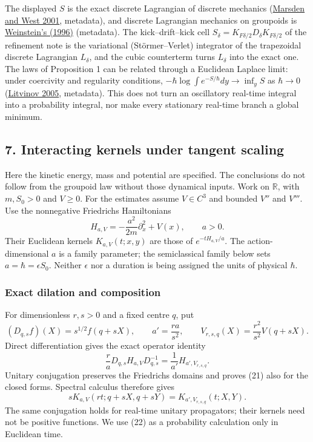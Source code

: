 \documentclass[11pt,a4paper]{article}
\begin{document}
The displayed \(S\) is the exact discrete Lagrangian of discrete
mechanics (\href{https://doi.org/10.1017/S096249290100006X}{Marsden and
West 2001}, metadata), and discrete Lagrangian mechanics on groupoids is
\href{https://doi.org/10.1090/fic/007/10}{Weinstein's (1996)}
(metadata). The kick--drift--kick cell
\(S_\delta=K_{F\delta/2}D_\delta K_{F\delta/2}\) of the refinement note
is the variational (Störmer--Verlet) integrator of the trapezoidal
discrete Lagrangian \(L_\delta\), and the cubic counterterm turns
\(L_\delta\) into the exact one. The laws of Proposition 1 can be
related through a Euclidean Laplace limit: under coercivity and
regularity conditions, \(-\hbar\log\int e^{-S/\hbar}dy\to\inf_y S\) as
\(\hbar\to0\) (\href{https://doi.org/10.1090/conm/377/06982}{Litvinov
2005}, metadata). This does not turn an oscillatory real-time integral
into a probability integral, nor make every stationary real-time branch
a global minimum.

\subsection{7. Interacting kernels under tangent
scaling}\label{interacting-kernels-under-tangent-scaling}

\protect{}\label{7-interacting-kernels-under-tangent-scaling}{}

Here the kinetic energy, mass and potential are specified. The
conclusions do not follow from the groupoid law without those dynamical
inputs. Work on \(\mathbb R\), with \(m,S_0>0\) and \(V\ge0\). For the
estimates assume \(V\in C^3\) and bounded \(V''\) and \(V'''\). Use the
nonnegative Friedrichs Hamiltonians
\[H_{a,V}=-\frac{a^2}{2m}\partial_x^2+V(x),\qquad a>0.\] Their Euclidean
kernels \(K_{a,V}(t;x,y)\) are those of \(e^{-tH_{a,V}/a}\). The
action-dimensional \(a\) is a family parameter; the semiclassical family
below sets \(a=\hbar=\epsilon S_0\). Neither \(\epsilon\) nor a duration
is being assigned the units of physical \(\hbar\).

\subsubsection{Exact dilation and
composition}\label{exact-dilation-and-composition}

For dimensionless \(r,s>0\) and a fixed centre \(q\), put \[
 (D_{q,s}f)(X)=s^{1/2}f(q+sX),\qquad
 a'=\frac{ra}{s^2},\qquad
 V_{r,s,q}(X)=\frac{r^2}{s^2}V(q+sX).
 \tag{20}
\] Direct differentiation gives the exact operator identity \[
 \frac r a D_{q,s}H_{a,V}D_{q,s}^{-1}
 =\frac1{a'}H_{a',V_{r,s,q}}.
 \tag{21}
\] Unitary conjugation preserves the Friedrichs domains and proves (21)
also for the closed forms. Spectral calculus therefore gives \[
 s K_{a,V}(rt;q+sX,q+sY)
 =K_{a',V_{r,s,q}}(t;X,Y).
 \tag{22}
\] The same conjugation holds for real-time unitary propagators; their
kernels need not be positive functions. We use (22) as a probability
calculation only in Euclidean time.
\end{document}
